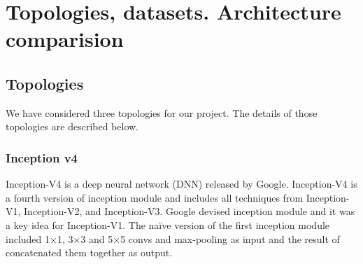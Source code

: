 \documentclass[titlepage]{report}
\begin{document}

\chapter{Topologies, datasets. Architecture comparision}

\section{Topologies}
We have considered three topologies for our project. The details of those topologies are described below.

\subsection{Inception v4}
Inception-V4 is a deep neural network (DNN) released by Google. Inception-V4 is a fourth version of inception module and includes all techniques from Inception-V1, Inception-V2, and Inception-V3. Google devised inception module and it was a key idea for Inception-V1. The naïve version of the first inception module included 1×1, 3×3 and 5×5 convs and max-pooling as input and the result of concatenated them together as output. \\
\pagebreak
\end{document}
